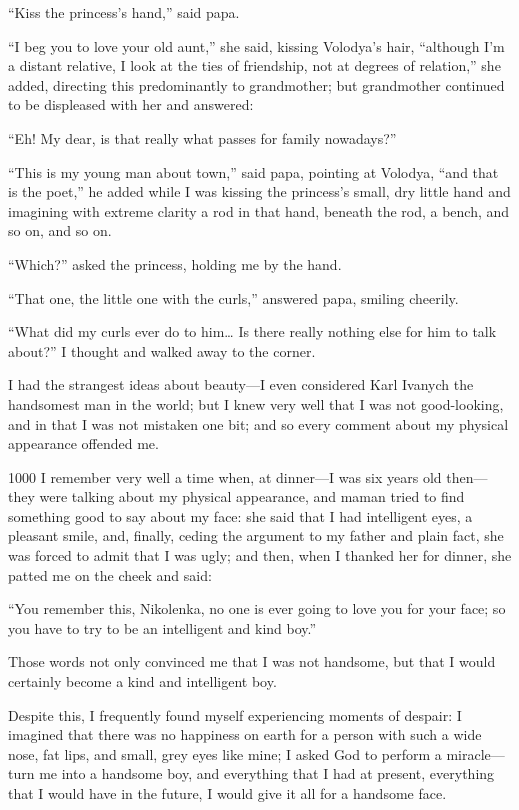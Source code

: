 ``Kiss the princess's hand,'' said papa. %

``I beg you to love your old aunt,'' she said, kissing Volodya's hair, ``although I'm a distant relative, I look at the ties of friendship, not at degrees of relation,'' she added, directing this predominantly to grandmother; but grandmother continued to be displeased with her and answered:

``Eh! My dear, is that really what passes for family nowadays?'' %

``This is my young man about town,'' said papa, pointing at Volodya, ``and that is the poet,'' he added while I was kissing the princess's small, dry little hand and imagining with extreme clarity a rod in that hand, beneath the rod, a bench, and so on, and so on. %

``Which?'' asked the princess, holding me by the hand. %

``That one, the little one with the curls,'' answered papa, smiling cheerily.

``What did my curls ever do to him\ldots{} Is there really nothing else for him to talk about?'' I thought and walked away to the corner.

I had the strangest ideas about beauty---I even considered Karl Ivanych the handsomest man in the world; but I knew very well that I was not good-looking, and in that I was not mistaken one bit; and so every comment about my physical appearance offended me.

\begin{tolerant}{1000}
I remember very well a time when, at dinner---I was six years old then---they were talking about my physical appearance, and maman tried to find something good to say about my face: she said that I had intelligent eyes, a pleasant smile, and, finally, ceding the argument to my father and plain fact, she was forced to admit that I was ugly; and then, when I thanked her for dinner, she patted me on the cheek and said:
\end{tolerant}

``You remember this, Nikolenka, no one is ever going to love you for your face; so you have to try to be an intelligent and kind boy.'' %

Those words not only convinced me that I was not handsome, but that I would certainly become a kind and intelligent boy.

Despite this, I frequently found myself experiencing moments of despair: I imagined that there was no happiness on earth for a person with such a wide nose, fat lips, and small, grey eyes like mine; I asked God to perform a miracle---turn me into a handsome boy, and everything that I had at present, everything that I would have in the future, I would give it all for a handsome face.


